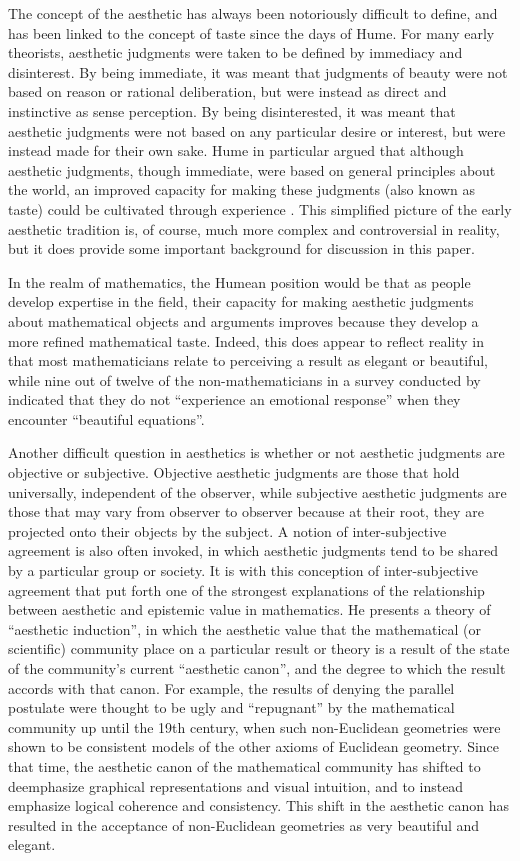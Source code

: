\documentclass[a4paper,man,natbib]{apa6}
\begin{document}
The concept of the aesthetic has always been notoriously difficult to define, and has been linked to the concept
of taste since the days of Hume. For many early theorists, aesthetic
judgments were taken to be defined by immediacy and disinterest. By being immediate, it was meant that judgments
of beauty were not based on reason or rational deliberation, but were instead as direct and instinctive as
sense perception. By being disinterested, it was meant that aesthetic judgments were not based on any particular
desire or interest, but were instead made for their own sake. Hume in particular argued that although aesthetic
judgments, though immediate, were based on general principles about the world, an improved capacity for making
these judgments (also known as taste) could be cultivated through experience \citep{sep-aesthetic-concept}. 
This simplified picture of the early aesthetic tradition is, of course, much more complex and controversial 
in reality, but it does provide some important background for discussion in this paper.

In the realm of mathematics, the Humean position would be that as people develop expertise in the field, 
their capacity for making aesthetic judgments about mathematical objects and arguments improves 
because they develop a more refined mathematical taste. Indeed, this does appear to reflect reality in that
most mathematicians relate to perceiving a result as elegant or beautiful, while nine out of twelve of the
non-mathematicians in a survey conducted by \cite{zeki_experience_2014} indicated that they do not
``experience an emotional response'' when they encounter ``beautiful equations''. 

Another difficult question in aesthetics is whether or not aesthetic judgments are objective or subjective.
Objective aesthetic judgments are those that hold universally, independent of the observer, while subjective
aesthetic judgments are those that may vary from observer to observer because at their root, they are projected
onto their objects by the subject. A notion of inter-subjective agreement
is also often invoked, in which aesthetic judgments tend to be shared by a particular group or society. It is
with this conception of inter-subjective agreement that \cite{mcallister_mathematical_2005} put forth one
of the strongest explanations of the relationship between aesthetic and epistemic value in mathematics. He
presents a theory of ``aesthetic induction'', in which the aesthetic value that the mathematical (or scientific)
community place on a particular result or theory is a result of the state of the community's current ``aesthetic
canon'', and the degree to which the result accords with that canon. For example, the results of denying the 
parallel postulate were thought to be ugly and ``repugnant'' by the mathematical community up until the 19th 
century, when such non-Euclidean geometries were shown to be consistent models of the other axioms of Euclidean
geometry. Since that time, the aesthetic canon of the mathematical community has shifted to deemphasize graphical
representations and visual intuition, and to instead emphasize logical coherence and consistency. This shift
in the aesthetic canon has resulted in the acceptance of non-Euclidean geometries as very beautiful and elegant.
\end{document}
